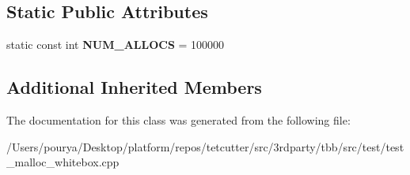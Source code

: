 \subsection*{Static Public Attributes}
\begin{DoxyCompactItemize}
\item 
\hypertarget{classTestCollapsingMallocFree_aa8f3f07fc207d153e9c11b0ba68a931d}{}static const int {\bfseries N\+U\+M\+\_\+\+A\+L\+L\+O\+C\+S} = 100000\label{classTestCollapsingMallocFree_aa8f3f07fc207d153e9c11b0ba68a931d}

\end{DoxyCompactItemize}
\subsection*{Additional Inherited Members}


The documentation for this class was generated from the following file\+:\begin{DoxyCompactItemize}
\item 
/\+Users/pourya/\+Desktop/platform/repos/tetcutter/src/3rdparty/tbb/src/test/test\+\_\+malloc\+\_\+whitebox.\+cpp\end{DoxyCompactItemize}
